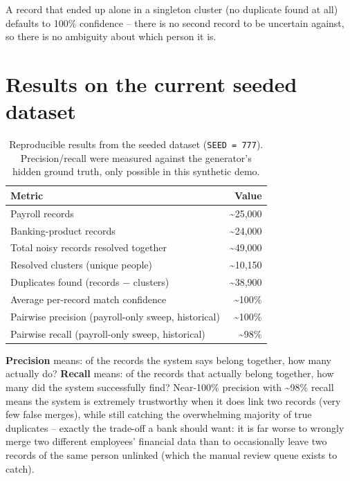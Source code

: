 \documentclass[11pt]{report}
\begin{document}
A record that ended up alone in a singleton cluster (no duplicate found at all) defaults to 100\% confidence -- there is no second record to be uncertain against, so there is no ambiguity about which person it is.

\section{Results on the current seeded dataset}

\begin{table}[h]
\centering
\small
\begin{tabular}{@{}lr@{}}
\toprule
\textbf{Metric} & \textbf{Value} \\
\midrule
Payroll records & \textasciitilde25,000 \\
Banking-product records & \textasciitilde24,000 \\
Total noisy records resolved together & \textasciitilde49,000 \\
Resolved clusters (unique people) & \textasciitilde10,150 \\
Duplicates found (records $-$ clusters) & \textasciitilde38,900 \\
Average per-record match confidence & \textasciitilde100\% \\
Pairwise precision (payroll-only sweep, historical) & \textasciitilde100\% \\
Pairwise recall (payroll-only sweep, historical) & \textasciitilde98\% \\
\bottomrule
\end{tabular}
\caption{Reproducible results from the seeded dataset (\texttt{SEED = 777}). Precision/recall were measured against the generator's hidden ground truth, only possible in this synthetic demo.}
\end{table}

\begin{bizbox}
\textbf{Precision} means: of the records the system says belong together, how many actually do? \textbf{Recall} means: of the records that actually belong together, how many did the system successfully find? Near-100\% precision with \textasciitilde98\% recall means the system is extremely trustworthy when it does link two records (very few false merges), while still catching the overwhelming majority of true duplicates -- exactly the trade-off a bank should want: it is far worse to wrongly merge two different employees' financial data than to occasionally leave two records of the same person unlinked (which the manual review queue exists to catch).
\end{bizbox}
\end{document}
